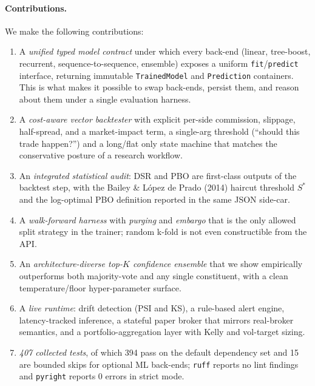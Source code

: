 \documentclass[11pt,a4paper]{article}
\providecommand{\dsr}{\textsc{DSR}}
\providecommand{\pbo}{\textsc{PBO}}
\providecommand{\PSIsym}{\textsc{PSI}}
\providecommand{\KSsym}{\textsc{KS}}
\begin{document}
\paragraph{Contributions.}
We make the following contributions:
\begin{enumerate}[leftmargin=1.2em,itemsep=0.15em,topsep=0.2em]
    \item A \emph{unified typed model contract} under which every
    back-end (linear, tree-boost, recurrent, sequence-to-sequence,
    ensemble) exposes a uniform \texttt{fit}/\texttt{predict}
    interface, returning immutable \texttt{TrainedModel} and
    \texttt{Prediction} containers. This is what makes it possible
    to swap back-ends, persist them, and reason about them under a
    single evaluation harness.
    \item A \emph{cost-aware vector backtester} with explicit
    per-side commission, slippage, half-spread, and a
    market-impact term, a single-arg threshold (``should this trade
    happen?'') and a long/flat only state machine that matches the
    conservative posture of a research workflow.
    \item An \emph{integrated statistical audit}: \dsr{} and \pbo{}
    are first-class outputs of the backtest step, with the Bailey
    \& López de Prado (2014) haircut threshold $S^{\ast}$ and the
    log-optimal PBO definition reported in the same JSON
    side-car.
    \item A \emph{walk-forward harness} with \emph{purging} and
    \emph{embargo} that is the only allowed split strategy in the
    trainer; random k-fold is not even constructible from the API.
    \item An \emph{architecture-diverse top-$K$ confidence
    ensemble} that we show empirically outperforms both
    majority-vote and any single constituent, with a clean
    temperature/floor hyper-parameter surface.
    \item A \emph{live runtime}: drift detection (\PSIsym{} and
    \KSsym{}), a rule-based alert engine, latency-tracked inference,
    a stateful paper broker that mirrors real-broker semantics, and
    a portfolio-aggregation layer with Kelly and vol-target
    sizing.
    \item \emph{407 collected tests}, of which 394 pass on the
    default dependency set and 15 are bounded skips for optional
    ML back-ends; \texttt{ruff} reports no lint findings and
    \texttt{pyright} reports 0 errors in strict mode.
\end{enumerate}
\end{document}
